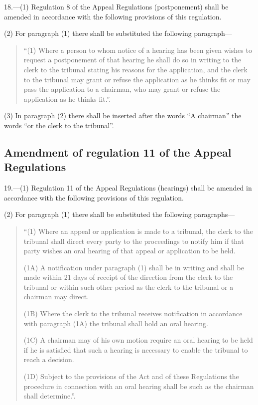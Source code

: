 \documentclass[12pt,a4paper]{article}
\begin{document}
18.—(1) Regulation 8 of the Appeal Regulations (postponement) shall be amended in accordance with the following provisions of this regulation.

(2) For paragraph (1) there shall be substituted the following paragraph—
\begin{quotation}
“(1) Where a person to whom notice of a hearing has been given wishes to request a postponement of that hearing he shall do so in writing to the clerk to the tribunal stating his reasons for the application, and the clerk to the tribunal may grant or refuse the application as he thinks fit or may pass the application to a chairman, who may grant or refuse the application as he thinks fit.”.
\end{quotation}

(3) In paragraph (2) there shall be inserted after the words “A chairman” the words “or the clerk to the tribunal”.

\subsection[19. Amendment of regulation 11 of the Appeal Regulations]{Amendment of regulation 11 of the Appeal Regulations}

19.—(1) Regulation 11 of the Appeal Regulations (hearings) shall be amended in accordance with the following provisions of this regulation.

(2) For paragraph (1) there shall be substituted the following paragraphs—
\begin{quotation}
“(1) Where an appeal or application is made to a tribunal, the clerk to the tribunal shall direct every party to the proceedings to notify him if that party wishes an oral hearing of that appeal or application to be held.

(1A) A notification under paragraph (1) shall be in writing and shall be made within 21 days of receipt of the direction from the clerk to the tribunal or within such other period as the clerk to the tribunal or a chairman may direct.

(1B) Where the clerk to the tribunal receives notification in accordance with paragraph (1A) the tribunal shall hold an oral hearing.

(1C) A chairman may of his own motion require an oral hearing to be held if he is satisfied that such a hearing is necessary to enable the tribunal to reach a decision.

(1D) Subject to the provisions of the Act and of these Regulations the procedure in connection with an oral hearing shall be such as the chairman shall determine.”.
\end{quotation}
\end{document}
